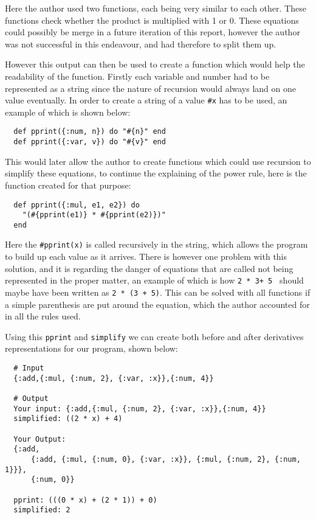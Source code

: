 \documentclass[a4paper,11pt]{article}
\begin{document}
Here the author used two functions, each being very similar to each other. These functions check whether the product is multiplied with 1 or 0. These equations could possibly be merge in a future iteration of this report, however the author was not successful in this endeavour, and had therefore to split them up.

However this output can then be used to create a function which would help the readability of the function. Firstly each variable and number had to be represented as a string since the nature of recursion would always land on one value eventually. In order to create a string of a value {\tt #{x}} has to be used, an example of which is shown below:

\begin{verbatim}
  def pprint({:num, n}) do "#{n}" end
  def pprint({:var, v}) do "#{v}" end
\end{verbatim}

This would later allow the author to create functions which could use recursion to simplify these equations, to continue the explaining of the power rule, here is the function created for that purpose:

\begin{verbatim}
  def pprint({:mul, e1, e2}) do 
    "(#{pprint(e1)} * #{pprint(e2)})" 
  end
\end{verbatim}

Here the {\tt #{pprint(x)}} is called recursively in the string, which allows the program to build up each value as it arrives. There is however one problem with this solution, and it is regarding the danger of equations that are called not being represented in the proper matter, an example of which is how {\tt 2 * 3+ 5 } should maybe have been written as {\tt 2 * (3 + 5)}. This can be solved with all functions if a simple parenthesis are put around the equation, which the author accounted for in all the rules used. 

Using this {\tt pprint} and {\tt simplify} we can create both before and after derivatives representations for our program, shown below:


\begin{verbatim}
  # Input
  {:add,{:mul, {:num, 2}, {:var, :x}},{:num, 4}}

  # Output
  Your input: {:add,{:mul, {:num, 2}, {:var, :x}},{:num, 4}}
  simplified: ((2 * x) + 4)

  Your Output: 
  {:add, 
      {:add, {:mul, {:num, 0}, {:var, :x}}, {:mul, {:num, 2}, {:num, 1}}}, 
      {:num, 0}}
  
  pprint: (((0 * x) + (2 * 1)) + 0)
  simplified: 2
\end{verbatim}
\end{document}
